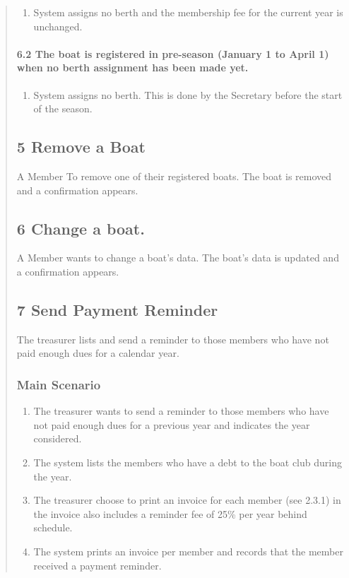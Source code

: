 \begin{quote}
\begin{enumerate}
\tightlist
\item
  System assigns no berth and the membership fee for the current year is
  unchanged.
\end{enumerate}

\paragraph{6.2 The boat is registered in pre-season (January 1 to April
1) when no berth assignment has been made
yet.}\label{the-boat-is-registered-in-pre-season-january-1-to-april-1-when-no-berth-assignment-has-been-made-yet.}

\begin{enumerate}
\tightlist
\item
  System assigns no berth. This is done by the Secretary before the
  start of the season.
\end{enumerate}

\subsection{5 Remove a Boat}\label{remove-a-boat}

A Member To remove one of their registered boats. The boat is removed
and a confirmation appears.

\subsection{6 Change a boat.}\label{change-a-boat.}

A Member wants to change a boat's data. The boat's data is updated and a
confirmation appears.

\subsection{7 Send Payment Reminder}\label{send-payment-reminder}

The treasurer lists and send a reminder to those members who have not
paid enough dues for a calendar year.

\subsubsection{Main Scenario}\label{main-scenario-3}

\begin{enumerate}
\tightlist
\item
  The treasurer wants to send a reminder to those members who have not
  paid enough dues for a previous year and indicates the year
  considered.
\item
  The system lists the members who have a debt to the boat club during
  the year.
\item
  The treasurer choose to print an invoice for each member (see 2.3.1)
  in the invoice also includes a reminder fee of 25\% per year behind
  schedule.
\item
  The system prints an invoice per member and records that the member
  received a payment reminder.
\end{enumerate}


\end{quote}
